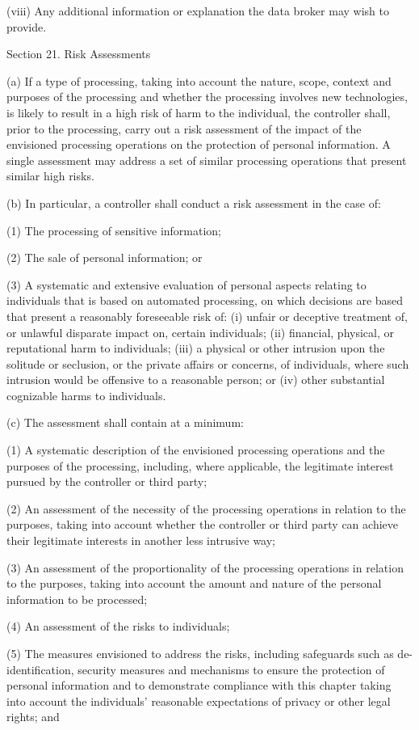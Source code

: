 (viii) Any additional information or explanation the data broker may wish to provide.

Section 21. Risk Assessments

(a) If a type of processing, taking into account the nature, scope, context and purposes of the processing and whether the processing involves new technologies, is likely to result in a high risk of harm to the individual, the controller shall, prior to the processing, carry out a risk assessment of the impact of the envisioned processing operations on the protection of personal information. A single assessment may address a set of similar processing operations that present similar high risks.

(b) In particular, a controller shall conduct a risk assessment in the case of:

(1) The processing of sensitive information;  

(2) The sale of personal information; or

(3) A systematic and extensive evaluation of personal aspects relating to individuals that is based on automated processing, on which decisions are based that present a reasonably foreseeable risk of: (i) unfair or deceptive treatment of, or unlawful disparate impact on, certain individuals; (ii) financial, physical, or reputational harm to individuals; (iii) a physical or other intrusion upon the solitude or seclusion, or the private affairs or concerns, of individuals, where such intrusion would be offensive to a reasonable person; or (iv) other substantial cognizable harms to individuals.

(c) The assessment shall contain at a minimum:

(1) A systematic description of the envisioned processing operations and the purposes of the processing, including, where applicable, the legitimate interest pursued by the controller or third party;

(2) An assessment of the necessity of the processing operations in relation to the purposes, taking into account whether the controller or third party can achieve their legitimate interests in another less intrusive way;

(3) An assessment of the proportionality of the processing operations in relation to the purposes, taking into account the amount and nature of the personal information to be processed;

(4) An assessment of the risks to individuals;

(5) The measures envisioned to address the risks, including safeguards such as de-identification, security measures and mechanisms to ensure the protection of personal information and to demonstrate compliance with this chapter taking into account the individuals’ reasonable expectations of privacy or other legal rights; and 

